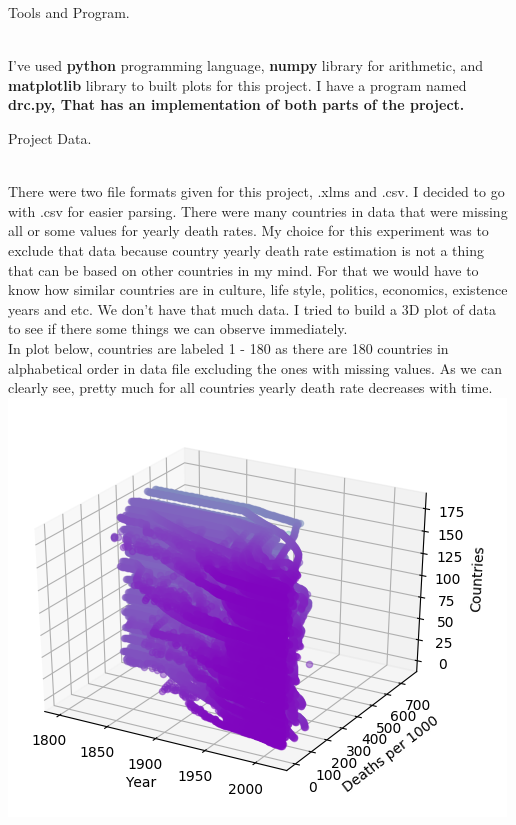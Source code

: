 \documentclass[12pt, letterpaper]{article}
\begin{document}
\begin{enumerate}[label=\Roman*.]

	{\bf \item Tools and Program.}\\
	
	I've used {\bf python} programming language, {\bf numpy} library for arithmetic, and {\bf matplotlib} library to built plots for this project. I have a program named {\bf drc.py, That has an implementation of both parts of the project. }\\
	
	{\bf \item Project Data.} \\
	
	There were two file formats given for this project, .xlms and .csv. I decided to go with .csv for easier parsing. There were many countries in data that were missing all or some values for yearly death rates. My choice for this experiment was to exclude that data because country yearly death rate estimation is not a thing that can be based on other countries in my mind. For that we would have to know how similar countries are in culture, life style, politics, economics,  existence  years and etc. We don't have that much data. I tried to build a 3D plot of data to see if there some things we can observe immediately. \\
	In plot below, countries are labeled 1 - 180 as there are 180 countries in alphabetical order in data file excluding the ones with missing values. As we can clearly see, pretty much for all countries yearly death rate decreases with time. \\
		\includegraphics[scale=0.9]{original1.png} \\

\end{enumerate}
\end{document}
